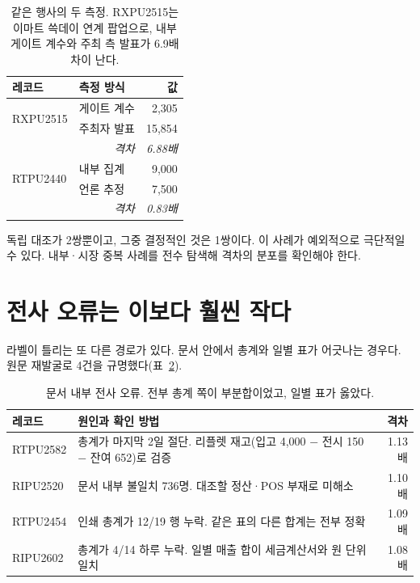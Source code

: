 \documentclass[10pt]{article}
\begin{document}
\begin{table}[t]\centering\tsize
\caption{같은 행사의 두 측정. RXPU2515는 이마트 쓱데이 연계 팝업으로,
내부 게이트 계수와 주최 측 발표가 6.9배 차이 난다.}
\label{tab:pairs}
\begin{tabular}{llr}
\toprule
레코드 & 측정 방식 & 값 \\
\midrule
\multirow{2}{*}{RXPU2515} & 게이트 계수 & 2{,}305 \\
 & 주최자 발표 & 15{,}854 \\
\multicolumn{2}{r}{\itshape 격차} & \itshape 6.88배 \\
\midrule
\multirow{2}{*}{RTPU2440} & 내부 집계 & 9{,}000 \\
 & 언론 추정 & 7{,}500 \\
\multicolumn{2}{r}{\itshape 격차} & \itshape 0.83배 \\
\bottomrule
\end{tabular}
\end{table}

{독립 대조가 2쌍뿐이고, 그중 결정적인 것은 1쌍이다. 이 사례가 예외적으로 극단적일 수 있다.
내부·시장 중복 사례를 전수 탐색해 격차의 분포를 확인해야 한다.}

\section{전사 오류는 이보다 훨씬 작다}

라벨이 틀리는 또 다른 경로가 있다. 문서 안에서 총계와 일별 표가 어긋나는 경우다.
원문 재발굴로 4건을 규명했다(표~\ref{tab:transcription}).

\begin{table}[t]\centering\tsize
\caption{문서 내부 전사 오류. 전부 총계 쪽이 부분합이었고, 일별 표가 옳았다.}
\label{tab:transcription}
\begin{tabular}{p{1.55cm}p{3.3cm}r}
\toprule
레코드 & 원인과 확인 방법 & 격차 \\
\midrule
RTPU2582 & 총계가 마지막 2일 절단. 리플렛 재고(입고 4{,}000 $-$ 전시 150 $-$ 잔여 652)로 검증 & 1.13배 \\
RIPU2520 & 문서 내부 불일치 736명. 대조할 정산·POS 부재로 미해소 & 1.10배 \\
RTPU2454 & 인쇄 총계가 12/19 행 누락. 같은 표의 다른 합계는 전부 정확 & 1.09배 \\
RIPU2602 & 총계가 4/14 하루 누락. 일별 매출 합이 세금계산서와 원 단위 일치 & 1.08배 \\
\bottomrule
\end{tabular}
\end{table}
\end{document}
